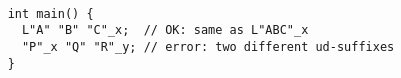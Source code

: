 \paragraph{} %
\begin{example} %
  \begin{lstlisting}
    int main() {
      L"A" "B" "C"_x;  // OK: same as L"ABC"_x
      "P"_x "Q" "R"_y; // error: two different ud-suffixes
    }
  \end{lstlisting}
\end{example}
